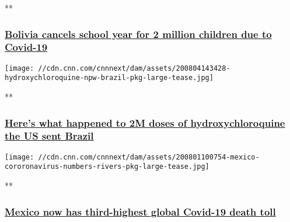 **

\hypertarget{bolivia-cancels-school-year-for-2-million-children-due-to-covid-19}{%
\subsubsection{\texorpdfstring{\href{/videos/world/2020/08/05/bolivia-schools-closed-coronavirus-covid-19-pandemic-cases-latin-america-oppmann-pkg-intl-ldn-vpx.cnn}{Bolivia
cancels school year for 2 million children due to
Covid-19}}{Bolivia cancels school year for 2 million children due to Covid-19}}\label{bolivia-cancels-school-year-for-2-million-children-due-to-covid-19}}

\href{/videos/world/2020/08/04/brazil-coronavirus-covid-19-pandemic-jair-bolsonaro-donald-trump-hydroxychloroquine-npw-intl-ldn-vpx.cnn}{}

\texttt{[image: //cdn.cnn.com/cnnnext/dam/assets/200804143428-hydroxychloroquine-npw-brazil-pkg-large-tease.jpg]}

**

\hypertarget{heres-what-happened-to-2m-doses-of-hydroxychloroquine-the-us-sent-brazil}{%
\subsubsection{\texorpdfstring{\href{/videos/world/2020/08/04/brazil-coronavirus-covid-19-pandemic-jair-bolsonaro-donald-trump-hydroxychloroquine-npw-intl-ldn-vpx.cnn}{Here's
what happened to 2M doses of hydroxychloroquine the US sent
Brazil}}{Here's what happened to 2M doses of hydroxychloroquine the US sent Brazil}}\label{heres-what-happened-to-2m-doses-of-hydroxychloroquine-the-us-sent-brazil}}

\href{/videos/world/2020/08/01/mexico-coronavirus-death-toll-rivers-pkg-vpx.cnn}{}

\texttt{[image: //cdn.cnn.com/cnnnext/dam/assets/200801100754-mexico-cororonavirus-numbers-rivers-pkg-large-tease.jpg]}

**

\hypertarget{mexico-now-has-third-highest-global-covid-19-death-toll}{%
\subsubsection{\texorpdfstring{\href{/videos/world/2020/08/01/mexico-coronavirus-death-toll-rivers-pkg-vpx.cnn}{Mexico
now has third-highest global Covid-19 death
toll}}{Mexico now has third-highest global Covid-19 death toll}}\label{mexico-now-has-third-highest-global-covid-19-death-toll}}

